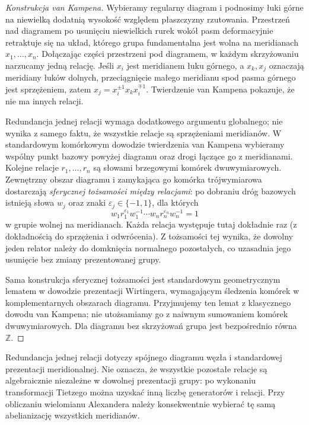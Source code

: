 \begin{proof}[Konstrukcja van Kampena]
Wybieramy regularny diagram i podnosimy łuki górne na
niewielką dodatnią wysokość względem płaszczyzny rzutowania.
Przestrzeń nad diagramem po usunięciu niewielkich rurek
wokół pasm deformacyjnie retraktuje się na układ, którego
grupa fundamentalna jest wolna na meridianach $x_1,\dots,x_n$.
Dołączając części przestrzeni pod diagramem, w każdym
skrzyżowaniu narzucamy jedną relację. Jeśli $x_i$ jest
meridianem łuku górnego, a $x_k,x_j$ oznaczają meridiany
łuków dolnych, przeciągnięcie małego meridianu spod pasma
górnego jest sprzężeniem, zatem $x_j=x_i^{\pm1}x_kx_i^{\mp1}$.
Twierdzenie van Kampena pokazuje, że nie ma innych relacji.

Redundancja jednej relacji wymaga dodatkowego
argumentu globalnego; nie wynika z samego faktu,
że wszystkie relacje są sprzężeniami meridianów.
W standardowym komórkowym dowodzie twierdzenia
van Kampena wybieramy wspólny punkt bazowy powyżej
diagramu oraz drogi łączące go z meridianami.
Kolejne relacje $r_1,\ldots,r_n$ są słowami
brzegowymi komórek dwuwymiarowych.
Zewnętrzny obszar diagramu i zamykająca go
komórka trójwymiarowa dostarczają
\emph{sferycznej tożsamości między relacjami}:
po dobraniu dróg bazowych istnieją słowa $w_j$
oraz znaki $\varepsilon_j\in\{-1,1\}$, dla których
\[
w_1r_1^{\varepsilon_1}w_1^{-1}
\cdots
w_nr_n^{\varepsilon_n}w_n^{-1}=1
\]
w grupie wolnej na meridianach.
Każda relacja występuje tutaj dokładnie raz
(z dokładnością do sprzężenia i odwrócenia).
Z tożsamości tej wynika, że dowolny jeden
relator należy do domknięcia normalnego
pozostałych, co uzasadnia jego usunięcie
bez zmiany prezentowanej grupy.

Sama konstrukcja sferycznej tożsamości jest
standardowym geometrycznym lematem w dowodzie
prezentacji Wirtingera, wymagającym śledzenia
komórek w komplementarnych obszarach diagramu.
Przyjmujemy ten lemat z klasycznego dowodu
van Kampena; nie utożsamiamy go z naiwnym
sumowaniem komórek dwuwymiarowych.
Dla diagramu bez skrzyżowań
grupa jest bezpośrednio równa $\mathbb Z$.
\end{proof}

\begin{uwaga}
Redundancja jednej relacji dotyczy spójnego diagramu węzła
i standardowej prezentacji meridionalnej. Nie oznacza,
że wszystkie pozostałe relacje są algebraicznie niezależne
w dowolnej prezentacji grupy: po wykonaniu transformacji
Tietzego można uzyskać inną liczbę generatorów i relacji.
Przy obliczaniu wielomianu Alexandera należy konsekwentnie
wybierać tę samą abelianizację wszystkich meridianów.
\end{uwaga}

